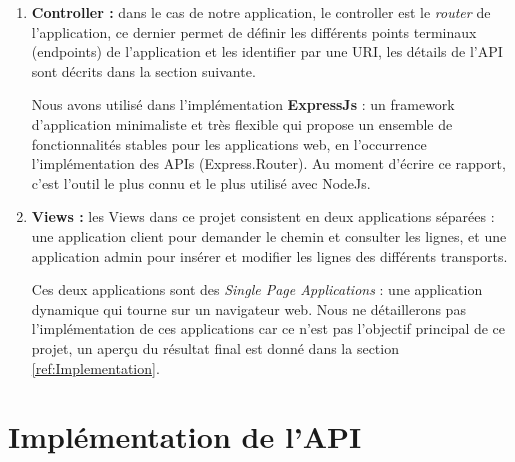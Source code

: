 \begin{enumerate}
	\item \textbf{Controller :} dans le cas de notre application, le controller est le \emph{router} de l'application, ce dernier permet de définir les différents points terminaux (endpoints) de l'application et les identifier par une URI, les détails de l'API sont décrits dans la section suivante.

Nous avons utilisé dans l'implémentation \textbf{ExpressJs} : un framework d'application minimaliste et très flexible qui propose un ensemble de fonctionnalités stables pour les applications web, en l'occurrence l'implémentation des APIs (Express.Router). Au moment d'écrire ce rapport, c'est l'outil le plus connu et le plus utilisé avec NodeJs.
	
	\item \textbf{Views :} les Views dans ce projet consistent en deux applications séparées : une application client pour demander le chemin et consulter les lignes, et une application admin pour insérer et modifier les lignes des différents transports.

Ces deux applications sont des \emph{Single Page Applications} : une application dynamique qui tourne sur un navigateur web.
Nous ne détaillerons pas l'implémentation de ces applications car ce n'est pas l'objectif principal de ce projet, un aperçu du résultat final est donné dans la section \ref{ref:Implementation}.
	\end{enumerate}
	
	
	
\section{Implémentation de l'API}
\label{ref:API}
